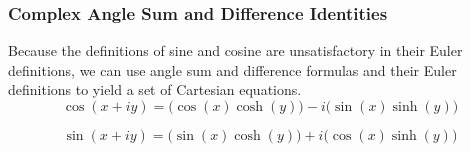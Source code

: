 \subsubsection{Complex Angle Sum and Difference Identities}\label{subsubsec:Complex_Angle_Sum_Difference_Identities}
Because the definitions of sine and cosine are unsatisfactory in their Euler definitions, we can use angle sum and difference formulas and their Euler definitions to yield a set of Cartesian equations.
\begin{equation}\label{eq:Cos_Angle_Sum_Difference}
  \cos(x + iy) = \bigl( \cos(x) \cosh(y) \bigr) - i \bigl( \sin(x) \sinh(y) \bigr)
\end{equation}

\begin{equation}\label{eq:Sin_Angle_Sum_Difference}
  \sin(x + iy) = \bigl( \sin(x) \cosh(y) \bigr) + i \bigl( \cos(x) \sinh(y) \bigr)
\end{equation}


